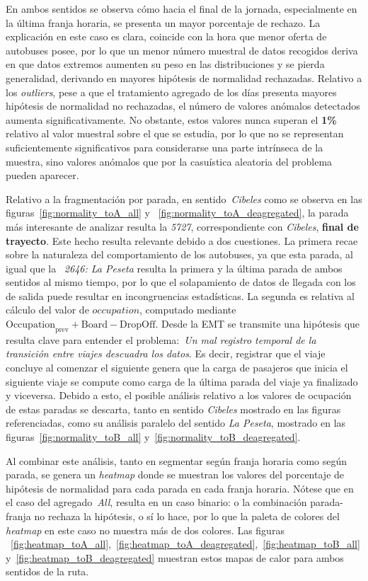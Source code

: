 En ambos sentidos se observa cómo hacia el final de la jornada, especialmente en la última franja horaria, se presenta un mayor
porcentaje de rechazo. La explicación en este caso es clara, coincide con la hora que menor oferta de autobuses posee, por lo que un 
menor número muestral de datos recogidos deriva en que datos extremos aumenten su peso en las distribuciones y se pierda
generalidad, derivando en mayores hipótesis de normalidad rechazadas.
Relativo a los \textit{outliers}, pese a que el tratamiento agregado de los días presenta mayores hipótesis de normalidad no 
rechazadas, el número de valores anómalos detectados aumenta significativamente. No obstante, estos valores nunca
superan el \textbf{1\%} relativo al valor muestral sobre el que se estudia, por lo que no se representan suficientemente
significativos para considerarse una parte intrínseca de la muestra, sino valores anómalos que por la casuística aleatoria del 
problema pueden aparecer.

Relativo a la fragmentación por parada, en sentido~\textit{Cibeles} como se observa en las figuras~\ref{fig:normality_toA_all} y
~\ref{fig:normality_toA_deagregated}, la parada más interesante de analizar resulta la \textit{5727}, correspondiente con 
\textit{Cibeles}, \textbf{final de trayecto}. Este hecho resulta relevante debido a dos cuestiones.
La primera recae sobre la naturaleza del comportamiento de los autobuses, ya que esta parada, al igual que la
~\textit{2646: La Peseta} resulta la primera y la última parada de ambos sentidos al mismo tiempo, por lo que el solapamiento 
de datos de llegada con los de salida puede resultar en incongruencias estadísticas.
La segunda es relativa al cálculo del valor de $occupation$, computado mediante $\text{Occupation}_{\text{prev}}
 + \text{Board} - \text{DropOff}$. Desde la EMT se transmite una hipótesis que resulta clave para entender el 
 problema:~\textit{Un mal registro 
 temporal de la transición entre viajes descuadra los datos}. Es decir, registrar que el viaje concluye al comenzar el siguiente
 genera que la carga de pasajeros que inicia el siguiente viaje se compute como carga de la última parada del viaje
 ya finalizado y viceversa. Debido a esto, el posible análisis relativo a los valores de ocupación de estas paradas se descarta,
 tanto en sentido \textit{Cibeles} mostrado en las figuras referenciadas, como su análisis paralelo del sentido \textit{La Peseta},
 mostrado en las figuras~\ref{fig:normality_toB_all} y~\ref{fig:normality_toB_deagregated}.


Al combinar este análisis, tanto en segmentar según franja horaria como según parada, se genera un \textit{heatmap} donde
se muestran los valores del porcentaje de hipótesis de normalidad para cada parada en cada franja horaria. Nótese que en el caso
del agregado~\textit{All}, resulta en un caso binario: o la combinación parada-franja no rechaza la hipótesis, o sí lo hace,
por lo que la paleta de colores del \textit{heatmap} en este caso no muestra más de dos colores. Las figuras
~\ref{fig:heatmap_toA_all},~\ref{fig:heatmap_toA_deagregated},~\ref{fig:heatmap_toB_all} y~\ref{fig:heatmap_toB_deagregated}
muestran estos mapas de calor para ambos sentidos de la ruta.


